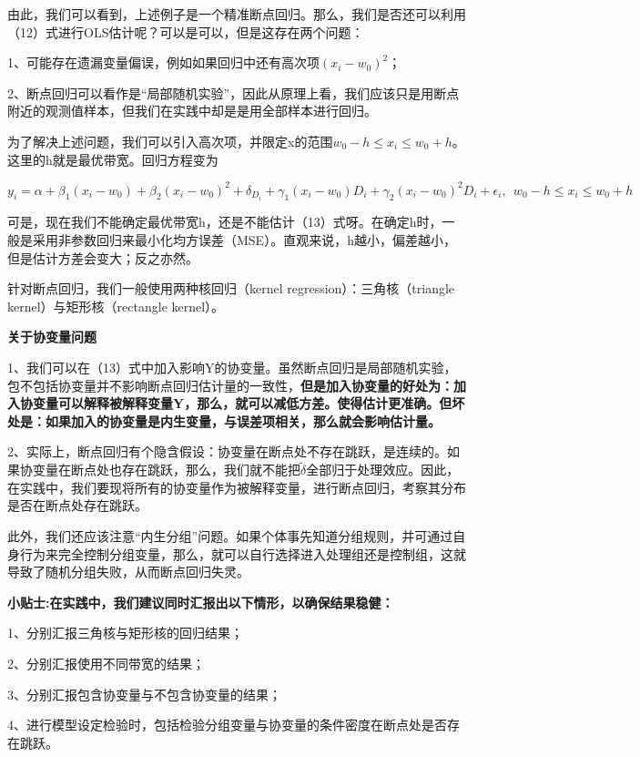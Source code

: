\documentclass[cn,12pt,math=newtx,citestyle=gb7714-2015,bibstyle=gb7714-2015]{elegantbook}
\begin{document}
	由此，我们可以看到，上述例子是一个精准断点回归。那么，我们是否还可以利用（12）式进行OLS估计呢？可以是可以，但是这存在两个问题：
	
	1、可能存在遗漏变量偏误，例如如果回归中还有高次项$(x_i-w_0)^2$；
	
	2、断点回归可以看作是“局部随机实验”，因此从原理上看，我们应该只是用断点附近的观测值样本，但我们在实践中却是是用全部样本进行回归。
	
	为了解决上述问题，我们可以引入高次项，并限定x的范围$w_0-h\le{x_i}\le{w_0+h}$。这里的h就是最优带宽。回归方程变为
	
	\begin{equation}
		y_i=\alpha+\beta_1(x_i-w_0)+\beta_2(x_i-w_0)^2+\delta_{D_i}+\gamma_1(x_i-w_0)D_i+\gamma_2(x_i-w_0)^2D_i+\epsilon_i,~~w_0-h\le{x_i}\le{w_0+h}
	\end{equation}
	
	可是，现在我们不能确定最优带宽h，还是不能估计（13）式呀。在确定h时，一般是采用非参数回归来最小化均方误差（MSE）。直观来说，h越小，偏差越小，但是估计方差会变大；反之亦然。
	
	针对断点回归，我们一般使用两种核回归（kernel regression）：三角核（triangle kernel）与矩形核（rectangle kernel）。
	
	\textbf{关于协变量问题}
	
	1、我们可以在（13）式中加入影响Y的协变量。虽然断点回归是局部随机实验，包不包括协变量并不影响断点回归估计量的一致性，\textbf{但是加入协变量的好处为：加入协变量可以解释被解释变量Y，那么，就可以减低方差。使得估计更准确。但坏处是：如果加入的协变量是内生变量，与误差项相关，那么就会影响估计量。}
	
	2、实际上，断点回归有个隐含假设：协变量在断点处不存在跳跃，是连续的。如果协变量在断点处也存在跳跃，那么，我们就不能把$\tilde{\delta}$全部归于处理效应。因此，在实践中，我们要现将所有的协变量作为被解释变量，进行断点回归，考察其分布是否在断点处存在跳跃。
	
	此外，我们还应该注意“内生分组”问题。如果个体事先知道分组规则，并可通过自身行为来完全控制分组变量，那么，就可以自行选择进入处理组还是控制组，这就导致了随机分组失败，从而断点回归失灵。
	
	\textbf{小贴士:在实践中，我们建议同时汇报出以下情形，以确保结果稳健：}
	
	1、分别汇报三角核与矩形核的回归结果；
	
	2、分别汇报使用不同带宽的结果；
	
	3、分别汇报包含协变量与不包含协变量的结果；
	
	4、进行模型设定检验时，包括检验分组变量与协变量的条件密度在断点处是否存在跳跃。
	
\end{document}
